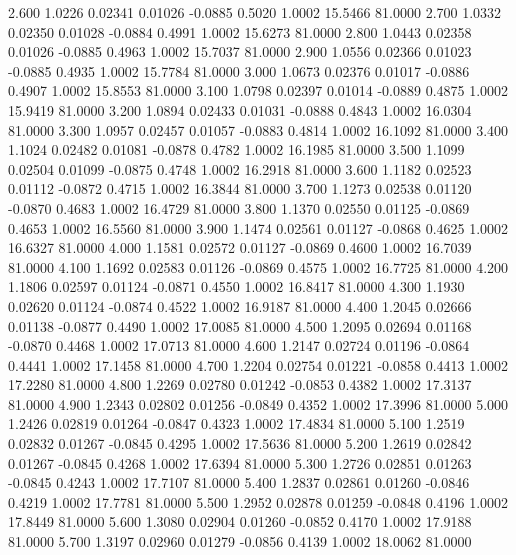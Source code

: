    2.600   1.0226   0.02341   0.01026  -0.0885   0.5020   1.0002  15.5466  81.0000
   2.700   1.0332   0.02350   0.01028  -0.0884   0.4991   1.0002  15.6273  81.0000
   2.800   1.0443   0.02358   0.01026  -0.0885   0.4963   1.0002  15.7037  81.0000
   2.900   1.0556   0.02366   0.01023  -0.0885   0.4935   1.0002  15.7784  81.0000
   3.000   1.0673   0.02376   0.01017  -0.0886   0.4907   1.0002  15.8553  81.0000
   3.100   1.0798   0.02397   0.01014  -0.0889   0.4875   1.0002  15.9419  81.0000
   3.200   1.0894   0.02433   0.01031  -0.0888   0.4843   1.0002  16.0304  81.0000
   3.300   1.0957   0.02457   0.01057  -0.0883   0.4814   1.0002  16.1092  81.0000
   3.400   1.1024   0.02482   0.01081  -0.0878   0.4782   1.0002  16.1985  81.0000
   3.500   1.1099   0.02504   0.01099  -0.0875   0.4748   1.0002  16.2918  81.0000
   3.600   1.1182   0.02523   0.01112  -0.0872   0.4715   1.0002  16.3844  81.0000
   3.700   1.1273   0.02538   0.01120  -0.0870   0.4683   1.0002  16.4729  81.0000
   3.800   1.1370   0.02550   0.01125  -0.0869   0.4653   1.0002  16.5560  81.0000
   3.900   1.1474   0.02561   0.01127  -0.0868   0.4625   1.0002  16.6327  81.0000
   4.000   1.1581   0.02572   0.01127  -0.0869   0.4600   1.0002  16.7039  81.0000
   4.100   1.1692   0.02583   0.01126  -0.0869   0.4575   1.0002  16.7725  81.0000
   4.200   1.1806   0.02597   0.01124  -0.0871   0.4550   1.0002  16.8417  81.0000
   4.300   1.1930   0.02620   0.01124  -0.0874   0.4522   1.0002  16.9187  81.0000
   4.400   1.2045   0.02666   0.01138  -0.0877   0.4490   1.0002  17.0085  81.0000
   4.500   1.2095   0.02694   0.01168  -0.0870   0.4468   1.0002  17.0713  81.0000
   4.600   1.2147   0.02724   0.01196  -0.0864   0.4441   1.0002  17.1458  81.0000
   4.700   1.2204   0.02754   0.01221  -0.0858   0.4413   1.0002  17.2280  81.0000
   4.800   1.2269   0.02780   0.01242  -0.0853   0.4382   1.0002  17.3137  81.0000
   4.900   1.2343   0.02802   0.01256  -0.0849   0.4352   1.0002  17.3996  81.0000
   5.000   1.2426   0.02819   0.01264  -0.0847   0.4323   1.0002  17.4834  81.0000
   5.100   1.2519   0.02832   0.01267  -0.0845   0.4295   1.0002  17.5636  81.0000
   5.200   1.2619   0.02842   0.01267  -0.0845   0.4268   1.0002  17.6394  81.0000
   5.300   1.2726   0.02851   0.01263  -0.0845   0.4243   1.0002  17.7107  81.0000
   5.400   1.2837   0.02861   0.01260  -0.0846   0.4219   1.0002  17.7781  81.0000
   5.500   1.2952   0.02878   0.01259  -0.0848   0.4196   1.0002  17.8449  81.0000
   5.600   1.3080   0.02904   0.01260  -0.0852   0.4170   1.0002  17.9188  81.0000
   5.700   1.3197   0.02960   0.01279  -0.0856   0.4139   1.0002  18.0062  81.0000
